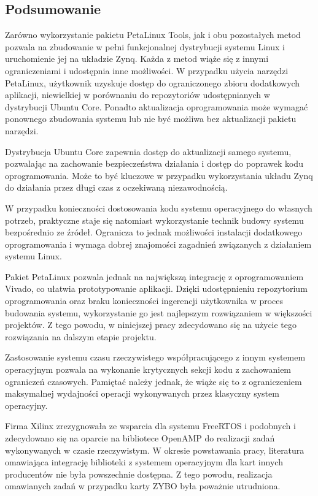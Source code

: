 \subsection*{Podsumowanie} %

Zarówno wykorzystanie pakietu PetaLinux Tools, jak i obu pozostałych metod pozwala na zbudowanie w pełni funkcjonalnej dystrybucji systemu Linux i uruchomienie jej na układzie Zynq. %
Każda z metod wiąże się z innymi ograniczeniami i udostępnia inne możliwości. 
W przypadku użycia narzędzi PetaLinux, użytkownik uzyskuje dostęp do ograniczonego zbioru dodatkowych aplikacji, niewielkiej w porównaniu do repozytoriów udostępnianych w dystrybucji Ubuntu Core. 
Ponadto aktualizacja oprogramowania może wymagać ponownego zbudowania systemu lub nie być możliwa bez aktualizacji pakietu narzędzi. 

Dystrybucja Ubuntu Core zapewnia dostęp do aktualizacji samego systemu, pozwalając na zachowanie bezpieczeństwa działania i dostęp do poprawek kodu oprogramowania. 
Może to być kluczowe w przypadku wykorzystania układu Zynq do działania przez długi czas z oczekiwaną niezawodnością. %

W przypadku konieczności dostosowania kodu systemu operacyjnego do własnych potrzeb, praktyczne staje się natomiast wykorzystanie technik budowy systemu bezpośrednio ze źródeł. 
Ogranicza to jednak możliwości instalacji dodatkowego oprogramowania i wymaga dobrej znajomości zagadnień związanych z działaniem systemu Linux.

Pakiet PetaLinux pozwala jednak na największą integrację z oprogramowaniem Vivado, co ułatwia prototypowanie aplikacji. 
Dzięki udostępnieniu repozytorium oprogramowania oraz braku konieczności ingerencji użytkownika w proces budowania systemu, wykorzystanie go jest najlepszym rozwiązaniem w większości projektów. 
Z tego powodu, w niniejszej pracy zdecydowano się na użycie tego rozwiązania na dalszym etapie projektu.

Zastosowanie systemu czasu rzeczywistego współpracującego z innym systemem operacyjnym pozwala na wykonanie krytycznych sekcji kodu z zachowaniem ograniczeń czasowych. Pamiętać należy jednak, że wiąże się to z ograniczeniem maksymalnej wydajności operacji wykonywanych przez klasyczny system operacyjny.

Firma Xilinx zrezygnowała ze wsparcia dla systemu FreeRTOS i podobnych i zdecydowano się na oparcie na bibliotece OpenAMP do realizacji zadań wykonywanych w czasie rzeczywistym. W okresie powstawania pracy, literatura omawiająca integrację biblioteki z systemem operacyjnym dla kart innych producentów nie była powszechnie dostępna. Z tego powodu, realizacja omawianych zadań w przypadku karty ZYBO była poważnie utrudniona.